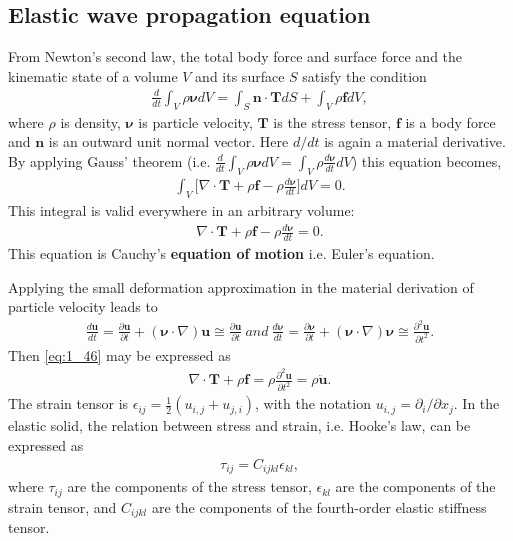     \subsection{Elastic wave propagation equation}

        From Newton's second law, the total body force and surface force and the kinematic state of a volume $V$ and its surface $S$ satisfy the condition
        \begin{align} \label{eq:1_44}
            \frac{d}{d t}\int_V\rho\bm{\nu}dV=\int_S\bm{n}\cdot\bm{T}dS + \int_V\rho\bm{f}dV,
        \end{align}
        where $\rho$ is density, $\bm{\nu}$ is particle velocity, $\bm{T}$ is the stress tensor, $\bm{f}$ is a body force and $\bm{n}$ is an outward unit normal vector.
Here $d/dt$ is again a material derivative. By applying Gauss' theorem
(i.e. $\frac{d}{dt}\int_V\rho\bm{\nu}dV=\int_V\rho\frac{d\bm{\nu}}{d t}dV$) this equation becomes,
        \begin{align} \label{eq:1_45}
            \int_V\biggl[\nabla\cdot\bm{T}+\rho\bm{f}-\rho\frac{d\bm{\nu}}{d t}\biggr]dV=0.
        \end{align}
        This integral is valid everywhere in an arbitrary volume:
        \begin{align} \label{eq:1_46}
            \nabla\cdot\bm{T}+\rho\bm{f}-\rho\frac{d\bm{\nu}}{d t}=0.
        \end{align}
        This equation is Cauchy's \textbf{equation of motion} i.e. Euler's equation.

        Applying the small deformation approximation in the material derivation of particle velocity leads to
        \begin{align} \label{eq:1_47}
            \frac{d \bm{u}}{d t}= \frac{\partial \bm{u}}{\partial t}+ (\bm{\nu}\cdot\nabla)\bm{u}\cong\frac{\partial \bm{u}}{\partial t}\: and\:
\frac{d\bm{\nu}}{d t}=\frac{\partial \bm{\nu}}{\partial t}+(\bm{\nu}\cdot\nabla)\bm{\nu}\cong\frac{\partial^2\bm{u}}{\partial t^2}.
        \end{align}
        Then \ref{eq:1_46} may be expressed as
        \begin{align} \label{eq:1_48}
            \nabla\cdot\bm{T}+\rho\bm{f}=\rho\frac{\partial^2 \bm{u}}{\partial t^2}=\rho\ddot{\bm{u}}.
        \end{align}
The strain tensor is $\epsilon_{ij}=\frac{1}{2}(u_{i,j}+u_{j,i})$, with the notation $u_{i,j}=\partial_i / \partial x_j$.
        In the elastic solid, the relation between stress and strain, i.e. Hooke's law, can be expressed as
        \begin{align} \label{eq:1_49}
            \tau_{ij}=C_{ijkl}\epsilon_{kl},
        \end{align}
        where $\tau_{ij}$ are the components of the stress tensor, $\epsilon_{kl}$ are the components of the strain tensor,
and $C_{ijkl}$ are the components of the fourth-order elastic stiffness tensor.

